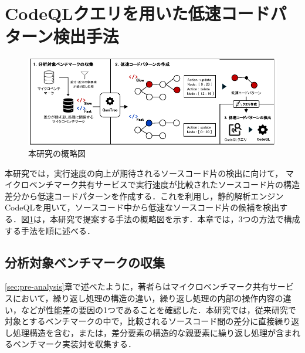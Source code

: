 \documentclass[submit,techrep,noauthor]{ipsj}
\newcommand{\memo}[1]{\colorbox{magenta!30}{{\bf MEMO}:}{\color{red!50} {\textbf{[#1]}}}}
\begin{document}
\section{CodeQLクエリを用いた低速コードパターン検出手法}
\label{sec:approach}

\begin{figure}[t]
    \centering
    \includegraphics[width=0.9\linewidth]{./Noguchi_fig/approach_abst.pdf}
    \caption{本研究の概略図}
    \label{fig:Approach}
\end{figure}

本研究では，実行速度の向上が期待されるソースコード片の検出に向けて，
マイクロベンチマーク共有サービスで実行速度が比較されたソースコード片の構造差分から低速コードパターンを作成する．これを利用し，静的解析エンジンCodeQLを用いて，ソースコード中から低速なソースコード片の候補を検出する．図\ref{fig:Approach}は，本研究で提案する手法の概略図を示す．本章では，3つの方法で構成する手法を順に述べる．


\subsection{分析対象ベンチマークの収集}

\ref{sec:pre-analysis}章で述べたように，著者らはマイクロベンチマーク共有サービスにおいて，繰り返し処理の構造の違い，繰り返し処理の内部の操作内容の違い，などが性能差の要因の1つであることを確認した．本研究では，従来研究\cite{omori}で対象とするベンチマークの中で，比較されるソースコード間の差分に直接繰り返し処理構造を含む，または，差分要素の構造的な親要素に繰り返し処理が含まれるベンチマーク実装対を収集する．
\end{document}
